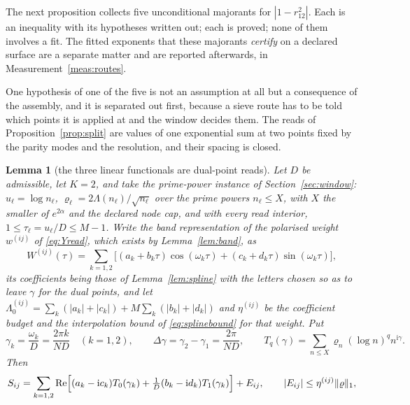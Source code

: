 \documentclass[11pt,a4paper]{article}
\theoremstyle{plain}
\newtheorem{lemma}[theorem]{Lemma}
\theoremstyle{definition}
\begin{document}
The next proposition collects five unconditional majorants for
$|1-r_{12}^{2}|$. Each is an inequality with its hypotheses written out; each is
proved; none of them involves a fit. The fitted exponents that these majorants
\emph{certify} on a declared surface are a separate matter and are reported
afterwards, in Measurement~\ref{meas:routes}.

One hypothesis of one of the five is not an assumption at all but a consequence
of the assembly, and it is separated out first, because a sieve route has to be
told which points it is applied at and the window decides them. The reads of
Proposition~\ref{prop:split} are values of one exponential sum at two points
fixed by the parity modes and the resolution, and their spacing is closed.

\begin{lemma}[the three linear functionals are dual-point reads]
\label{lem:dualpoint}
Let $D$ be admissible, let $K=2$, and take the prime-power instance of
Section~\ref{sec:window}: $u_\ell=\log n_\ell$,
$\varrho_\ell=2\Lambda(n_\ell)/\sqrt{n_\ell}$ over the prime powers
$n_\ell\le X$, with $X$ the smaller of $e^{2\alpha}$ and the declared node cap,
and with every read interior, $1\le\tau_\ell=u_\ell/D\le M-1$. Write the band
representation of the polarised weight $w^{(ij)}$ of \eqref{eq:Yread}, which
exists by Lemma~\ref{lem:band}, as
\begin{equation}
\label{eq:bandij}
  W^{(ij)}(\tau)=\sum_{k=1,2}
  \bigl[(a_k+b_k\tau)\cos(\omega_k\tau)
  +(c_k+d_k\tau)\sin(\omega_k\tau)\bigr],
\end{equation}
its coefficients being those of Lemma~\ref{lem:spline} with the letters chosen
so as to leave $\gamma$ for the dual points, and let
$\Lambda_0^{(ij)}=\sum_k(|a_k|+|c_k|)+M\sum_k(|b_k|+|d_k|)$ and $\eta^{(ij)}$
be the coefficient budget and the interpolation bound of
\eqref{eq:splinebound} for that weight. Put
\begin{equation}
\label{eq:dualpoints}
  \gamma_k=\frac{\omega_k}D=\frac{2\pi k}{ND}\quad(k=1,2),
  \qquad
  \Delta\gamma=\gamma_2-\gamma_1=\frac{2\pi}{ND},
  \qquad
  T_q(\gamma)=\sum_{n\le X}\varrho_n(\log n)^{q}n^{\mathrm i\gamma} .
\end{equation}
Then
\begin{equation}
\label{eq:dualread}
  S_{ij}=\sum_{k=1,2}\operatorname{Re}
  \Bigl[(a_k-\mathrm ic_k)T_0(\gamma_k)
  +\tfrac1D(b_k-\mathrm id_k)T_1(\gamma_k)\Bigr]+E_{ij},
  \qquad
  |E_{ij}|\le\eta^{(ij)}\lVert\varrho\rVert_1 ,
\end{equation}

\end{lemma}
\end{document}
